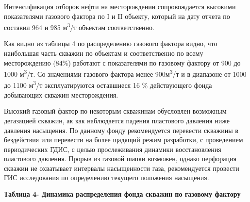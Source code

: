 Интенсификация отборов нефти на месторождении сопровождается высокими
показателями газового фактора по I и II объекту, который на дату отчета
по составил 964 и 985 м\textsuperscript{3}/т объектам соответственно.

Как видно из таблицы 4 по распределению газового фактора видно, что
наибольшая часть скважин по объектам и соответственно по всему
месторождению (84\%) работают с показателями по газовому фактору от 900
до 1000 м\textsuperscript{3}/т. Со значениями газового фактора менее
900м\textsuperscript{3}/т и в диапазоне от 1000 до 1100
м\textsuperscript{3}/т эксплуатируются оставшиеся 16 \% действующего
фонда добывающих скважин месторождения.

Высокий газовый фактор по некоторым скважинам обусловлен возможным
дегазацией скважин, ак как наблюдается падения пластового давления ниже
давления насыщения. По данному фонду рекомендуется перевести скважины в
бездействия или перевести на более щадящий режим разработки, с
проведением периодических ГДИС, с целью прослеживания динамики
восстановления пластового давления. Прорыв из газовой шапки возможен,
однако перфорация скважин не охватывает интервалы насыщенности газа,
рекомендуется провести ГИС исследования по определению текущего
положения насыщения.

{\bfseries Таблица 4- Динамика распределения фонда скважин по газовому
фактору}

